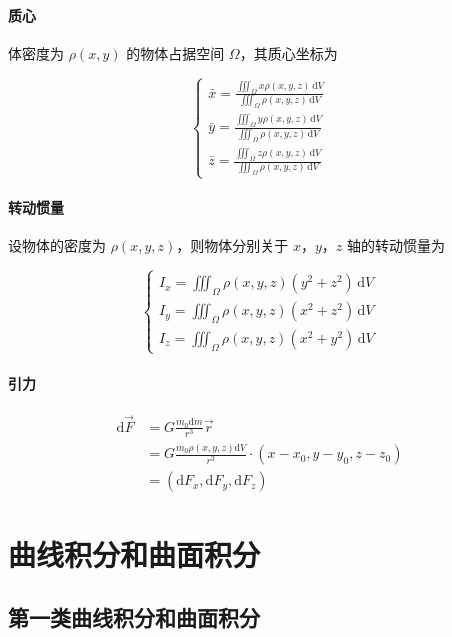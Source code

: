 \documentclass[lang = zh , final , oneside , openany , titlepage , zihao = -4 , linespread = 1.3 , baselineskip = false , cjk-font = windows , text-font = newtx , math-font = newtx]{sjtureport}
\begin{document}
\paragraph{质心}

体密度为 \(\rho(x, y)\) 的物体占据空间 \(\Omega\)，其质心坐标为

\[
\begin{cases}
  \bar{x} = \frac{\iiint_\Omega x\rho(x,y,z)\,\mathrm{d}V}{\iiint_\Omega\rho(x,y,z)\,\mathrm{d}V} \\
  \bar{y} = \frac{\iiint_\Omega y\rho(x,y,z)\,\mathrm{d}V}{\iiint_\Omega\rho(x,y,z)\,\mathrm{d}V}\\
  \bar{z} = \frac{\iiint_\Omega z\rho(x,y,z)\,\mathrm{d}V}{\iiint_\Omega\rho(x,y,z)\,\mathrm{d}V}
\end{cases}
\]

\paragraph{转动惯量}

设物体的密度为 \(\rho(x,y,z)\)，则物体分别关于 \(x\)，\(y\)，\(z\) 轴的转动惯量为

\[
\begin{cases}
  I_x = \iiint_\Omega \rho(x,y,z)(y^2 + z^2)\,\mathrm{d}V\\
  I_y = \iiint_\Omega \rho(x,y,z)(x^2 + z^2)\,\mathrm{d}V\\
  I_z = \iiint_\Omega \rho(x,y,z)(x^2 + y^2)\,\mathrm{d}V
\end{cases}
\]

\paragraph{引力}

\[
\begin{aligned}
  \mathrm{d}\vec{F} &= G\frac{m_0\mathrm{d}m}{r^3}\vec{r}\\
  &= G\frac{m_0\rho(x,y,z)\mathrm{d}V}{r^3}\cdot\left(x - x_0,y - y_0,z - z_0\right)\\
  &= \left(\mathrm{d}F_x,\mathrm{d}F_y,\mathrm{d}F_z\right)
\end{aligned}
\]

\section{曲线积分和曲面积分}

\subsection{第一类曲线积分和曲面积分}
\end{document}
